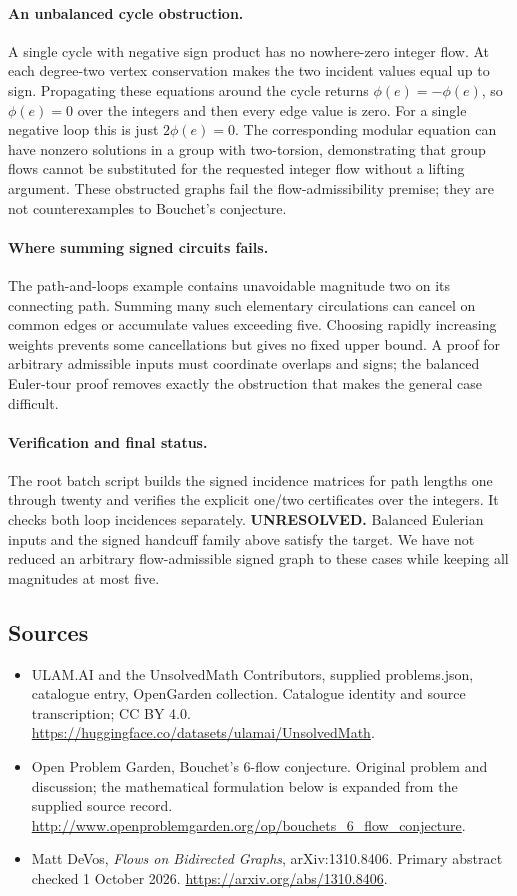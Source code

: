 \documentclass[11pt,a4paper]{article}
\begin{document}
\paragraph{An unbalanced cycle obstruction.}
A single cycle with negative sign product has no nowhere-zero integer
flow. At each degree-two vertex conservation makes the two incident
values equal up to sign. Propagating these equations around the cycle
returns $\phi(e)=-\phi(e)$, so $\phi(e)=0$ over the integers and then
every edge value is zero. For a single negative loop this is just
$2\phi(e)=0$. The corresponding modular equation can have nonzero
solutions in a group with two-torsion, demonstrating that group flows
cannot be substituted for the requested integer flow without a lifting
argument. These obstructed graphs fail the flow-admissibility premise;
they are not counterexamples to Bouchet's conjecture.

\paragraph{Where summing signed circuits fails.}
The path-and-loops example contains unavoidable magnitude two on its
connecting path. Summing many such elementary circulations can cancel
on common edges or accumulate values exceeding five. Choosing rapidly
increasing weights prevents some cancellations but gives no fixed upper
bound. A proof for arbitrary admissible inputs must coordinate overlaps
and signs; the balanced Euler-tour proof removes exactly the obstruction
that makes the general case difficult.

\paragraph{Verification and final status.}
The root batch script builds the signed incidence matrices for path
lengths one through twenty and verifies the explicit one/two certificates
over the integers. It checks both loop incidences separately.
\textbf{UNRESOLVED.} Balanced Eulerian inputs and the signed handcuff
family above satisfy the target. We have not reduced an arbitrary
flow-admissible signed graph to these cases while keeping all magnitudes
at most five.

\subsection{Sources}
\begin{itemize}
\item[S1] ULAM.AI and the UnsolvedMath Contributors, supplied problems.json, catalogue entry, OpenGarden collection. Catalogue identity and source transcription; CC BY 4.0.
\url{https://huggingface.co/datasets/ulamai/UnsolvedMath}.
\item[S2] Open Problem Garden, Bouchet's 6-flow conjecture. Original problem and discussion; the mathematical formulation below is expanded from the supplied source record.
\url{http://www.openproblemgarden.org/op/bouchets_6_flow_conjecture}.
\item[R1] Matt DeVos, \emph{Flows on Bidirected Graphs},
arXiv:1310.8406. Primary abstract checked 1 October 2026.
\url{https://arxiv.org/abs/1310.8406}.
\end{itemize}
\end{document}
